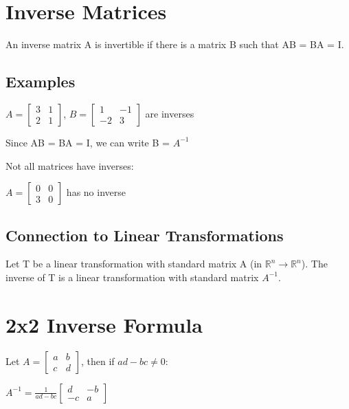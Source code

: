 \documentclass[12pt,a4paper]{article}
\begin{document}
\section{Inverse Matrices}

An inverse matrix A is invertible if there is a matrix B such that AB = BA = I.

\subsection{Examples}

\begin{center}
$A = \begin{bmatrix} 3 & 1 \\ 2 & 1 \end{bmatrix}$, $B = \begin{bmatrix} 1 & -1 \\ -2 & 3 \end{bmatrix}$ are inverses
\end{center}

Since AB = BA = I, we can write B = $A^{-1}$

Not all matrices have inverses:

\begin{center}
$A = \begin{bmatrix} 0 & 0 \\ 3 & 0 \end{bmatrix}$ has no inverse
\end{center}

\subsection{Connection to Linear Transformations}

Let T be a linear transformation with standard matrix A (in $\mathbb{R}^n \to \mathbb{R}^n$). 
The inverse of T is a linear transformation with standard matrix $A^{-1}$.

\section{2x2 Inverse Formula}

Let $A = \begin{bmatrix} a & b \\ c & d \end{bmatrix}$, then if $ad-bc \neq 0$:

\begin{center}
$A^{-1} = \frac{1}{ad-bc} \begin{bmatrix} d & -b \\ -c & a \end{bmatrix}$
\end{center}
\end{document}
